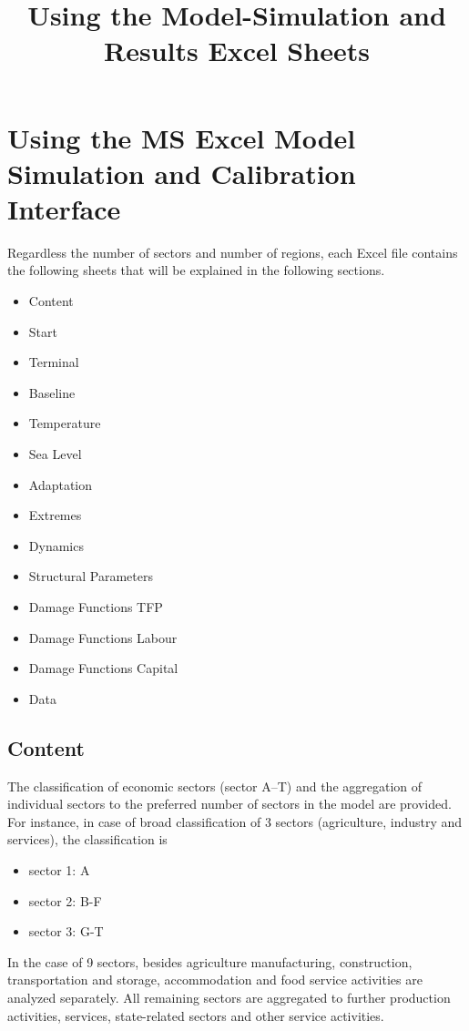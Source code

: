 \documentclass[10pt,a4paper]{article}
\begin{document}
\title{Using the Model-Simulation and Results Excel Sheets}
\maketitle
\section{Using the MS Excel Model Simulation and Calibration Interface}

Regardless the number of sectors and number of regions, each Excel file contains the following sheets that will be explained in the following sections.

\begin{itemize}\setlength{\itemsep}{0pt}
\item Content
\item Start
\item Terminal
\item Baseline
\item Temperature
\item Sea Level
\item Adaptation
\item Extremes
\item Dynamics
\item Structural Parameters
\item Damage Functions TFP
\item Damage Functions Labour
\item Damage Functions Capital
\item Data


\end{itemize}
\subsection{Content}
The classification of economic sectors (sector A--T) 
and the aggregation of individual sectors to the preferred number of sectors in the model are provided. For instance, in case of broad classification of 3 sectors (agriculture, industry and services), the classification is
\begin{itemize}
\item sector 1:	A
\item sector 2:	B-F
\item sector 3:	G-T
\end{itemize}
In the case of 9 sectors, besides agriculture manufacturing, construction, transportation and storage, accommodation and food service activities are analyzed separately. All remaining sectors are aggregated to further production activities, services, state-related sectors and other service activities.
\end{document}
